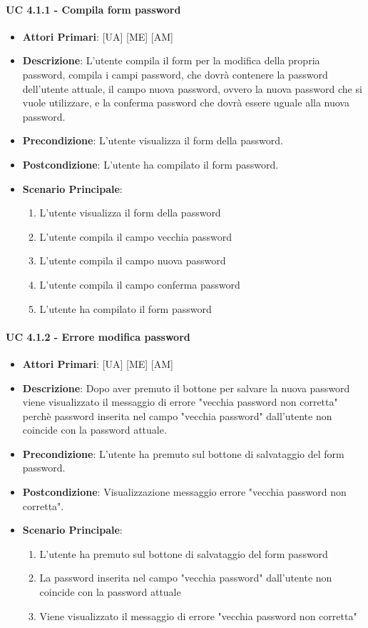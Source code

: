 			\paragraph{UC 4.1.1 - Compila form password}
			\begin{itemize}
				\item \textbf{Attori Primari}: [UA] [ME] [AM]
				\item \textbf{Descrizione}: L'utente compila il form per la modifica della propria password, compila i campi password, che dovrà contenere la password dell'utente attuale, il campo nuova password, ovvero la nuova password che si vuole utilizzare, e la conferma password che dovrà essere uguale alla nuova password.
				\item \textbf{Precondizione}: L'utente visualizza il form della password.
				\item \textbf{Postcondizione}: L'utente ha compilato il form password.
				\item \textbf{Scenario Principale}:
				\begin{enumerate}
					\item{L'utente visualizza il form della password}
					\item{L'utente compila il campo vecchia password}
					\item{L'utente compila il campo nuova password}
					\item{L'utente compila il campo conferma password}
					\item{L'utente ha compilato il form password}
				\end{enumerate}
			\end{itemize}

			\paragraph{UC 4.1.2 - Errore modifica password}
			\begin{itemize}
				\item \textbf{Attori Primari}: [UA] [ME] [AM]
				\item \textbf{Descrizione}: Dopo aver premuto il bottone per salvare la nuova password viene visualizzato il messaggio di errore "vecchia password non corretta" perchè password inserita nel campo "vecchia password" dall'utente non coincide con la password attuale.
				\item \textbf{Precondizione}: L'utente ha premuto sul bottone di salvataggio del form password.
				\item \textbf{Postcondizione}: Visualizzazione messaggio errore "vecchia password non corretta".
				\item \textbf{Scenario Principale}:
				\begin{enumerate}
					\item{L'utente ha premuto sul bottone di salvataggio del form password}
					\item{La password inserita nel campo "vecchia password" dall'utente non coincide con la password attuale}
					\item{Viene visualizzato il messaggio di errore "vecchia password non corretta"}
				\end{enumerate}
			\end{itemize}

